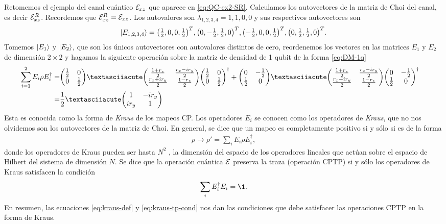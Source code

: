 Retomemos el ejemplo del canal cuántico $\mathcal{E}_{xz}$ que aparece en 
\eqref{eq:QC-ex2-SR}. Calculamos los autovectores de la matriz de 
Choi del canal, es decir $\mathcal{E}_{xz}^R$. Recordemos que $\mathcal{E}_{xz}^R=\mathcal{E}_{xz}$.
Los autovalores son $\lambda_{1,2,3,4}=1,1,0,0$ y sus respectivos 
autovectores son
\begin{align}
\ket{E_{1,2,3,4}}=
\mqty(\frac{1}{2},0,0,\frac{1}{2})^T,
\mqty(0,-\frac{1}{2},\frac{1}{2},0)^T,
\mqty(-\frac{1}{2},0,0,\frac{1}{2})^T,
\mqty(0,\frac{1}{2},\frac{1}{2},0)^T.
\end{align}
Tomemos $\ket{E_1}$ y $\ket{E_2}$, que son los únicos autovectores
con autovalores distintos de cero, reordenemos los vectores 
en las matrices $E_1$ y $E_2$ de dimensión $2\times2$ 
y hagamos la siguiente operación sobre la matriz de densidad 
de 1 qubit de la forma \eqref{eq:DM-1q}
\begin{align}
\sum_{i=1}^2E_i\rho E_i^{\dagger}=&
\mqty(
\frac{1}{2} & 0\\
0 & \frac{1}{2}
)´
\mqty(
\frac{1+r_z}{2}& \frac{r_x-ir_y}{2}\\
\frac{r_x+ir_y}{2} & \frac{1-r_z}{2}
)
\mqty(
\frac{1}{2} & 0\\
0 & \frac{1}{2}
)^{\dagger}
+
\mqty(
0 & -\frac{1}{2}\\
\frac{1}{2} & 0
)´
\mqty(
\frac{1+r_z}{2}& \frac{r_x-ir_y}{2}\\
\frac{r_x+ir_y}{2} & \frac{1-r_z}{2}
)
\mqty(
0 & -\frac{1}{2}\\
\frac{1}{2} & 0
)^{\dagger}&
\nonumber\\
=&
\frac{1}{2}´
\mqty(
1 & -ir_y\\
ir_y & 1
)
\label{eq:QC-ex2-KR}
\end{align}
Esta es conocida como la forma de \textit{Kraus} de los mapeos CP.
Los operadores $E_i$ se conocen como los operadores de \textit{Kraus}, 
que no nos olvidemos son los autovectores de la matriz de Choi. En general,
se dice que un mapeo es completamente positivo si y sólo si es de la forma
\cite{bengtsson_zyczkowski_2017}
\begin{align}
\rho \rightarrow \rho'=\sum_iE_i\rho E_i^{\dagger},
\label{eq:kraus-def}
\end{align}
donde los operadores de Kraus pueden ser hasta $N^2$ 
\cite{nielsen_chuang_2011}, la dimensión 
del espacio de los operadores lineales que actúan sobre el espacio de
Hilbert del sistema de dimensión $N$. Se dice que la operación cuántica
$\mathcal{E}$ preserva la traza (operación CPTP) si y sólo los operadores de Kraus 
satisfacen la condición \cite{bengtsson_zyczkowski_2017}
\begin{align}
\sum_iE_i^{\dagger}E_i=\1.
\label{eq:kraus-tp-cond}
\end{align}
En resumen, las ecuaciones \eqref{eq:kraus-def} y \eqref{eq:kraus-tp-cond}
nos dan las condiciones que debe satisfacer las operaciones CPTP en la 
forma de Kraus. 

